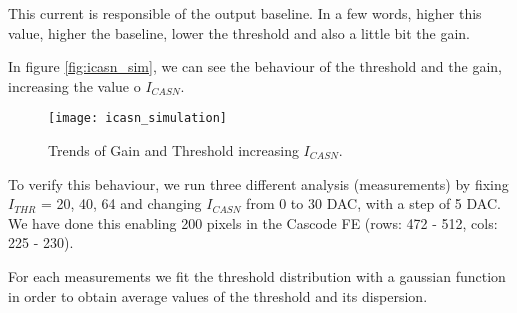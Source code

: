 This current is responsible of the output baseline. In a few words, higher this value, higher the baseline, lower the threshold and also a little bit the gain.

In figure \vref{fig:icasn_sim}, we can see the behaviour of the threshold and the gain, increasing the value o $I_{CASN}$.

\begin{figure}
\centering
\texttt{[image: icasn\_simulation]}
\caption{Trends of Gain and Threshold increasing $I_{CASN}$.}
\label{fig:icasn_sim}
\end{figure}

To verify this behaviour, we run three different analysis (measurements) by fixing $I_{THR}$ = 20, 40, 64 and changing $I_{CASN}$ from 0  to 30 DAC, with a step of 5 DAC. We have done this enabling 200 pixels in the Cascode FE (rows: 472 - 512, cols: 225 - 230).

For each measurements we fit the threshold distribution with a gaussian function in order to obtain average values of the threshold and its dispersion.

